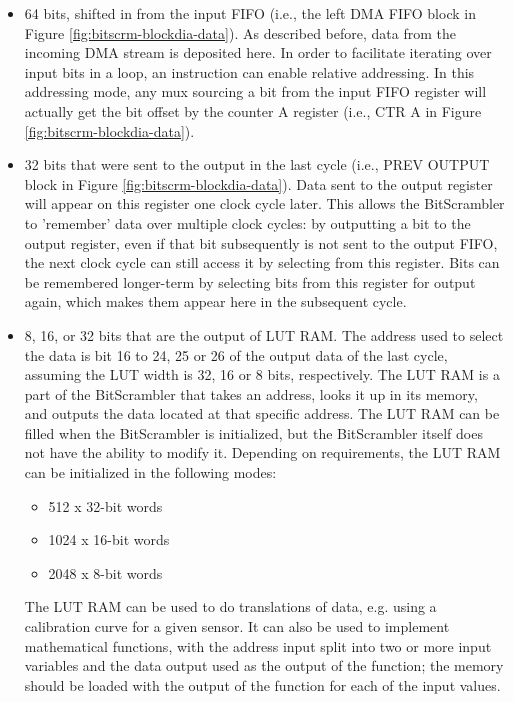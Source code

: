 \documentclass[main\_\_EN.tex]{subfiles}
\begin{document}
\begin{itemize}
\item 64 bits, shifted in from the input FIFO (i.e., the left DMA FIFO block in Figure \ref{fig:bitscrm-blockdia-data}).
As described before, data from the incoming DMA stream is deposited here. In order to facilitate iterating over input bits in a loop, an instruction can enable relative addressing. In this addressing mode, any mux sourcing a bit from the input FIFO register will actually get the bit offset by the counter A register (i.e., CTR A in Figure \ref{fig:bitscrm-blockdia-data}).
\item 32 bits that were sent to the output in the last cycle (i.e., PREV OUTPUT block in Figure \ref{fig:bitscrm-blockdia-data}).
Data sent to the output register will appear on this register one clock cycle later. This allows the BitScrambler to 'remember' data over multiple clock cycles: by outputting a bit to the output register, even if that bit subsequently is not sent to the output FIFO, the next clock cycle can still access it by selecting from this register. Bits can be remembered longer-term by selecting bits from this register for output again, which makes them appear here in the subsequent cycle.


\item 8, 16, or 32 bits that are the output of LUT RAM. The address used to select the data is bit 16 to 24, 25 or 26 of the output data of the last cycle, assuming the LUT width is 32, 16 or 8 bits, respectively.
The LUT RAM is a part of the BitScrambler that takes an address, looks it up in its memory, and outputs the data located at that specific address. The LUT RAM can be filled when the BitScrambler is initialized, but the BitScrambler itself does not have the ability to modify it. Depending on requirements, the LUT RAM can be initialized in the following modes:

\begin{itemize}
    \item 512 x 32-bit words
    \item 1024 x 16-bit words
    \item 2048 x 8-bit words
\end{itemize}

The LUT RAM can be used to do translations of data, e.g. using a calibration curve for a given sensor. It can also be used to implement mathematical functions, with the address input split into two or more input variables and the data output used as the output of the function; the memory should be loaded with the output of the function for each of the input values.


\end{itemize}
\end{document}
